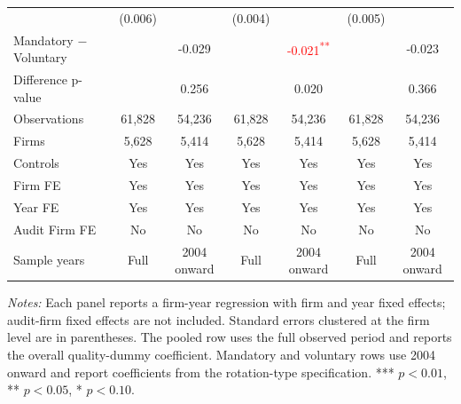 \documentclass[10pt]{article}
\newcommand{\sym}[1]{\textsuperscript{#1}}
\begin{document}
\begin{minipage}{19cm}
\begin{threeparttable}
\begin{tabular}{l cc cc cc}
 & (0.006) &  & (0.004) &  & (0.005) &  \\
Mandatory $-$ Voluntary &  & -0.029 &  & \textcolor{red}{-0.021\sym{**}} &  & -0.023 \\
Difference p-value &  & 0.256 &  & 0.020 &  & 0.366 \\
Observations & 61,828 & 54,236 & 61,828 & 54,236 & 61,828 & 54,236 \\
Firms & 5,628 & 5,414 & 5,628 & 5,414 & 5,628 & 5,414 \\
\midrule
Controls & Yes & Yes & Yes & Yes & Yes & Yes \\
Firm FE & Yes & Yes & Yes & Yes & Yes & Yes \\
Year FE & Yes & Yes & Yes & Yes & Yes & Yes \\
Audit Firm FE & No & No & No & No & No & No \\
Sample years & Full & 2004 onward & Full & 2004 onward & Full & 2004 onward \\
\bottomrule
\end{tabular}
\begin{tablenotes}\fontsize{9}{11}\selectfont
\item \fontsize{9}{11}\selectfont \textit{Notes:} Each panel reports a firm-year regression with firm and year fixed effects; audit-firm fixed effects are not included. Standard errors clustered at the firm level are in parentheses. The pooled row uses the full observed period and reports the overall quality-dummy coefficient. Mandatory and voluntary rows use 2004 onward and report coefficients from the rotation-type specification. *** \(p<0.01\), ** \(p<0.05\), * \(p<0.10\).
\end{tablenotes}
\end{threeparttable}

\end{minipage}
\end{document}
